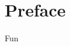 \documentclass[titlepage,12pt]{book}
\begin{document}
\maketitle
\frontmatter

\chapter*{Preface}
Fun

\tableofcontents
\mainmatter


%
%
%
%
%
%
%
\end{document}
